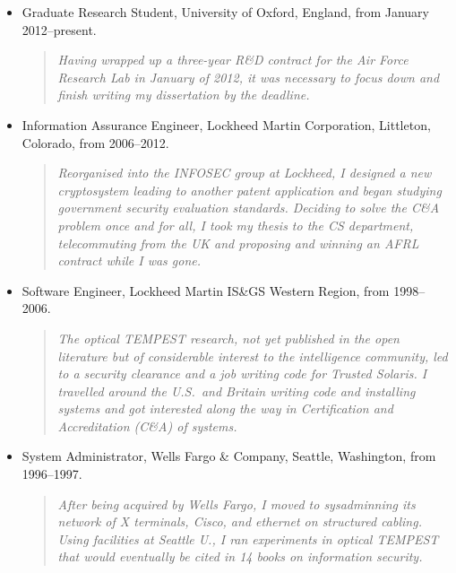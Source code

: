\documentclass[letterpaper]{article}
\begin{document}
\begin{itemize}
	\item Graduate Research Student, University of Oxford, England, from January 2012--present.

		\begin{quote}\vspace{-2mm}
			\emph{Having wrapped up a three-year R\&D contract for the Air Force Research
			Lab in January of 2012, it was necessary to focus down and finish writing my
			dissertation by the deadline.}
		\end{quote}

	\item Information Assurance Engineer, Lockheed Martin Corporation, Littleton, Colorado, from
		2006--2012.

		\begin{quote}\vspace{-2mm}
			\emph{Reorganised into the INFOSEC group at Lockheed, I designed a new
			cryptosystem leading to another patent application and began studying
			government security evaluation standards.  Deciding to solve the C\&A problem once
			and for all, I took my thesis to the CS department, telecommuting from the UK and
			proposing and winning an AFRL contract while I was gone.}
		\end{quote}

	\item Software Engineer, Lockheed Martin IS\&GS Western Region, from 1998--2006.

		\begin{quote}\vspace{-2mm}
			\emph{The optical TEMPEST research, not yet published in the open literature but of
			considerable interest to the intelligence community, led to a security clearance and
			a job writing code for Trusted Solaris.  I travelled around the U.S.\ and Britain
			writing code and installing systems and got interested along the way in
			Certification and Accreditation (C\&A) of systems.}
		\end{quote}

	\item System Administrator, Wells Fargo \& Company, Seattle, Washington, from  1996--1997.

		\begin{quote}\vspace{-2mm}
			\emph{After being acquired by Wells Fargo, I moved to sysadminning its network
			of X terminals, Cisco, and ethernet on structured cabling.  Using facilities
			at Seattle U., I ran experiments in optical TEMPEST that would eventually
			be cited in 14 books on information security.}
		\end{quote}


\end{itemize}
\end{document}
